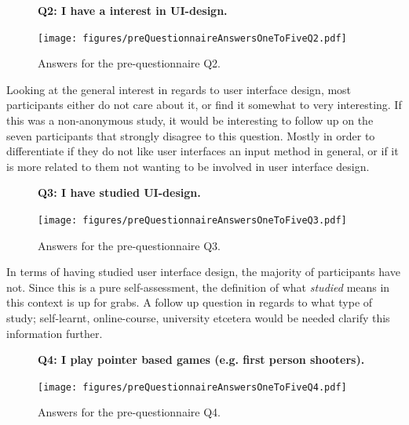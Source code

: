 \documentclass[nofilelist,dvipsnames]{cslthse-msc}
\begin{document}
{				\begin{figure}[h!]
          \textbf{Q2: I have a interest in UI-design.}
          \begin{center}
            \texttt{[image: figures/preQuestionnaireAnswersOneToFiveQ2.pdf]}
            \vspace{-1cm}
            \caption{Answers for the pre-questionnaire Q2.}
          \end{center}
				\end{figure}

        Looking at the general interest in regards to user interface design,
        most participants either do not care about it, or find it somewhat to
        very interesting. If this was a non-anonymous study, it would be
        interesting to follow up on the seven participants that strongly
        disagree to this question. Mostly in order to differentiate if they do
        not like user interfaces an input method in general, or if it is more
        related to them not wanting to be involved in user interface design.

				\begin{figure}[h!]
          \textbf{Q3: I have studied UI-design.}
          \begin{center}
            \texttt{[image: figures/preQuestionnaireAnswersOneToFiveQ3.pdf]}
            \vspace{-1cm}
            \caption{Answers for the pre-questionnaire Q3.}
          \end{center}
				\end{figure}

        In terms of having studied user interface design, the majority of
        participants have not. Since this is a pure self-assessment, the
        definition of what \textit{studied} means in this context is up for
        grabs. A follow up question in regards to what type of study;
        self-learnt, online-course, university etcetera would be needed clarify
        this information further.

				\begin{figure}[h!]
          \textbf{Q4: I play pointer based games (e.g. first person shooters).}
          \begin{center}
            \texttt{[image: figures/preQuestionnaireAnswersOneToFiveQ4.pdf]}
            \vspace{-1cm}
            \caption{Answers for the pre-questionnaire Q4.}
          \end{center}
				\end{figure}

}
\end{document}

